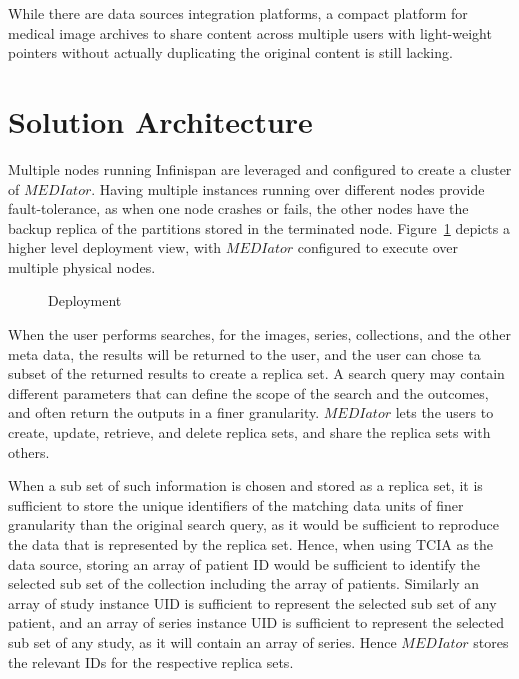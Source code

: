 \documentclass[conference]{IEEEtran}
\begin{document}
While there are data sources integration platforms, a compact platform for medical image archives to share content across multiple users with light-weight pointers without actually duplicating the original content is still lacking.


\section{Solution Architecture}

Multiple nodes running Infinispan are leveraged and configured to create a cluster of $MEDIator$. Having multiple instances running over different nodes provide fault-tolerance, as when one node crashes or fails, the other nodes have the backup replica of the partitions stored in the terminated node. Figure~\ref{fig:deployment} depicts a higher level deployment view, with $MEDIator$ configured to execute over multiple physical nodes.
\begin{figure}[!h]
\begin{center}
\end{center}
 \caption{Deployment}
 \label{fig:deployment}
 \vspace{-18pt}
\end{figure}

When the user performs searches, for the images, series, collections, and the other meta data, the results will be returned to the user, and the user can chose ta subset of the returned results to create a replica set. A search query may contain different parameters that can define the scope of the search and the outcomes, and often return the outputs in a finer granularity. $MEDIator$ lets the users to create, update, retrieve, and delete replica sets, and share the replica sets with others.

When a sub set of such information is chosen and stored as a replica set, it is sufficient to store the unique identifiers of the matching data units of finer granularity than the original search query, as it would be sufficient to reproduce the data that is represented by the replica set. Hence, when using TCIA as the data source, storing an array of patient ID would be sufficient to identify the selected sub set of the collection including the array of patients. Similarly an array of study instance UID is sufficient to represent the selected sub set of any patient, and an array of series instance UID is sufficient to represent the selected sub set of any study, as it will contain an array of series. Hence $MEDIator$ stores the relevant IDs for the respective replica sets.
\end{document}
